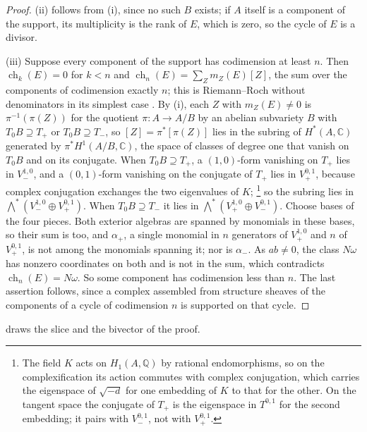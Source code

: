 \documentclass[11pt,reqno]{amsart}
\theoremstyle{plain}
\theoremstyle{definition}
\theoremstyle{remark}
\newcommand{\QQ}{\mathbb{Q}}
\newcommand{\CC}{\mathbb{C}}
\DeclareMathOperator{\ch}{ch}
\begin{document}
\begin{proof}
(ii) follows from (i), since no such $B$ exists; if $A$ itself is a
component of the support, its multiplicity is the rank of $E$, which is zero,
so the cycle of $E$ is a divisor.

(iii) Suppose every component of the support has codimension at least $n$.
Then $\ch_{k}(E)=0$ for $k<n$ and $\ch_{n}(E)=\sum_{Z}m_{Z}(E)[Z]$, the sum
over the components of codimension exactly $n$; this is Riemann--Roch without
denominators in its simplest case \cite[Chapter~15]{Ful98}. By (i), each $Z$
with $m_{Z}(E)\ne0$ is $\pi^{-1}(\pi(Z))$ for the quotient $\pi\colon A\to A/B$
by an abelian subvariety $B$ with $T_{0}B\supseteq T_{+}$ or
$T_{0}B\supseteq T_{-}$, so $[Z]=\pi^{*}[\pi(Z)]$ lies in the subring of
$H^{*}(A,\CC)$ generated by $\pi^{*}H^{1}(A/B,\CC)$, the space of classes of
degree one that vanish on $T_{0}B$ and on its conjugate. When
$T_{0}B\supseteq T_{+}$, a
$(1,0)$-form vanishing on $T_{+}$ lies in $V_{-}^{1,0}$, and a $(0,1)$-form
vanishing on the conjugate of $T_{+}$ lies in $V_{+}^{0,1}$, because complex
conjugation exchanges the two eigenvalues of $K$;%
\footnote{The field $K$ acts on $H_{1}(A,\QQ)$ by rational endomorphisms, so
on the complexification its action commutes with complex conjugation, which
carries the eigenspace of $\sqrt{-d}$ for one embedding of $K$ to that for the
other. On the tangent space the conjugate of $T_{+}$ is the eigenspace in
$T^{0,1}$ for the second embedding; it pairs with $V_{-}^{0,1}$, not with
$V_{+}^{0,1}$.}
so the subring lies in $\bigwedge^{*}(V_{-}^{1,0}\oplus V_{+}^{0,1})$. When
$T_{0}B\supseteq T_{-}$ it lies in $\bigwedge^{*}(V_{+}^{1,0}\oplus
V_{-}^{0,1})$. Choose bases of the four pieces. Both exterior algebras are
spanned by monomials in these bases, so their sum is too, and $\alpha_{+}$, a
single monomial in $n$ generators of $V_{+}^{1,0}$ and $n$ of $V_{+}^{0,1}$,
is not among the monomials spanning it; nor is $\alpha_{-}$. As $ab\ne0$, the
class $N\omega$ has nonzero coordinates on both and is not in the sum, which
contradicts $\ch_{n}(E)=N\omega$. So some component has codimension less
than $n$. The last assertion follows, since a complex assembled from
structure sheaves of the components of a cycle of codimension $n$ is
supported on that cycle.
\end{proof}

 draws the slice and the bivector of the proof.
\end{document}
